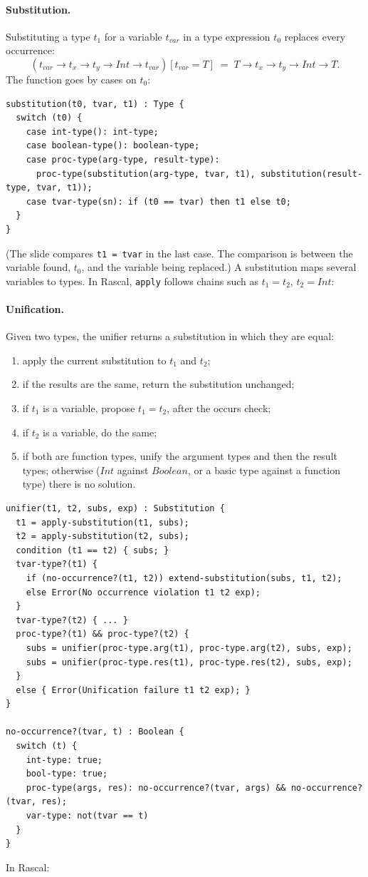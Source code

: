 \paragraph{Substitution.} Substituting a type $t_1$ for a variable $t_{\mathit{var}}$
in a type expression $t_0$ replaces every occurrence:
\[
(t_{\mathit{var}} \to t_x \to t_y \to \mathit{Int} \to t_{\mathit{var}})[t_{\mathit{var}} = T]
\;=\; T \to t_x \to t_y \to \mathit{Int} \to T.
\]
The function goes by cases on $t_0$:
\begin{lstlisting}
substitution(t0, tvar, t1) : Type {
  switch (t0) {
    case int-type(): int-type;
    case boolean-type(): boolean-type;
    case proc-type(arg-type, result-type):
      proc-type(substitution(arg-type, tvar, t1), substitution(result-type, tvar, t1));
    case tvar-type(sn): if (t0 == tvar) then t1 else t0;
  }
}
\end{lstlisting}
(The slide compares \texttt{t1 = tvar} in the last case. The comparison is
between the variable found, $t_0$, and the variable being replaced.) A
substitution maps several variables to types. In Rascal, \texttt{apply} follows
chains such as $t_1 = t_2$, $t_2 = \mathit{Int}$:

\paragraph{Unification.} Given two types, the unifier returns a substitution in
which they are equal:
\begin{enumerate}
  \item apply the current substitution to $t_1$ and $t_2$;
  \item if the results are the same, return the substitution unchanged;
  \item if $t_1$ is a variable, propose $t_1 = t_2$, after the occurs check;
  \item if $t_2$ is a variable, do the same;
  \item if both are function types, unify the argument types and then the
    result types; otherwise ($\mathit{Int}$ against $\mathit{Boolean}$, or a basic
    type against a function type) there is no solution.
\end{enumerate}
\begin{lstlisting}
unifier(t1, t2, subs, exp) : Substitution {
  t1 = apply-substitution(t1, subs);
  t2 = apply-substitution(t2, subs);
  condition (t1 == t2) { subs; }
  tvar-type?(t1) {
    if (no-occurrence?(t1, t2)) extend-substitution(subs, t1, t2);
    else Error(No occurrence violation t1 t2 exp);
  }
  tvar-type?(t2) { ... }
  proc-type?(t1) && proc-type?(t2) {
    subs = unifier(proc-type.arg(t1), proc-type.arg(t2), subs, exp);
    subs = unifier(proc-type.res(t1), proc-type.res(t2), subs, exp);
  }
  else { Error(Unification failure t1 t2 exp); }
}

no-occurrence?(tvar, t) : Boolean {
  switch (t) {
    int-type: true;
    bool-type: true;
    proc-type(args, res): no-occurrence?(tvar, args) && no-occurrence?(tvar, res);
    var-type: not(tvar == t)
  }
}
\end{lstlisting}
In Rascal:

